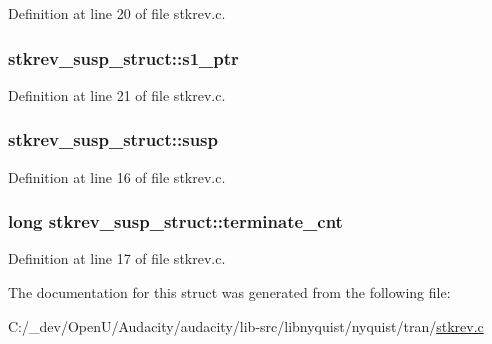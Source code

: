 Definition at line 20 of file stkrev.\+c.

\subsubsection[{\texorpdfstring{s1\+\_\+ptr}{s1_ptr}}]{ stkrev\+\_\+susp\+\_\+struct\+::s1\+\_\+ptr}\hypertarget{structstkrev__susp__struct_aae05566a404628c024836c25fad37440}{}\label{structstkrev__susp__struct_aae05566a404628c024836c25fad37440}


Definition at line 21 of file stkrev.\+c.

\subsubsection[{\texorpdfstring{susp}{susp}}]{ stkrev\+\_\+susp\+\_\+struct\+::susp}\hypertarget{structstkrev__susp__struct_a090fafa29e9d7afaa4df14d8dcf41786}{}\label{structstkrev__susp__struct_a090fafa29e9d7afaa4df14d8dcf41786}


Definition at line 16 of file stkrev.\+c.

\subsubsection[{\texorpdfstring{terminate\+\_\+cnt}{terminate_cnt}}]{\setlength{\rightskip}{0pt plus 5cm}long stkrev\+\_\+susp\+\_\+struct\+::terminate\+\_\+cnt}\hypertarget{structstkrev__susp__struct_a576c687abed167301e08b70740655063}{}\label{structstkrev__susp__struct_a576c687abed167301e08b70740655063}


Definition at line 17 of file stkrev.\+c.



The documentation for this struct was generated from the following file\+:\begin{DoxyCompactItemize}
\item 
C\+:/\+\_\+dev/\+Open\+U/\+Audacity/audacity/lib-\/src/libnyquist/nyquist/tran/\hyperlink{stkrev_8c}{stkrev.\+c}\end{DoxyCompactItemize}
